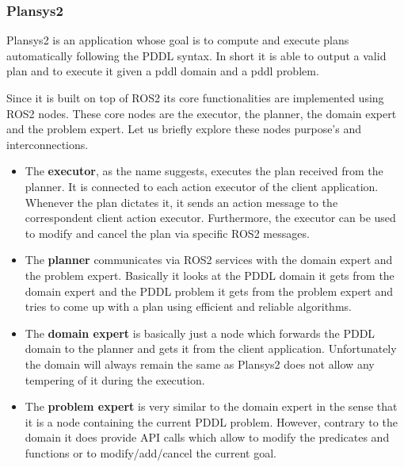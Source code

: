 \subsubsection{Plansys2} Plansys2 is an application whose goal is to compute and execute plans automatically following the PDDL syntax. In short it is able to output a valid plan and to execute it given a pddl domain and a pddl problem.
\par
Since it is built on top of ROS2 its core functionalities are implemented using ROS2 nodes. These core nodes are the executor, the planner, the domain expert and the problem expert. Let us briefly explore these nodes purpose's and interconnections.
\begin{itemize}
    \item The \textbf{executor}, as the name suggests, executes the plan received from the planner. It is connected to each action executor of the client application. Whenever the plan dictates it, it sends an action message to the correspondent client action executor. Furthermore, the executor can be used to modify and cancel the plan via specific ROS2 messages.
    \item The \textbf{planner} communicates via ROS2 services with the domain expert and the problem expert. Basically it looks at the PDDL domain it gets from the domain expert and the PDDL problem it gets from the problem expert and tries to come up with a plan using efficient and reliable algorithms.
    \item The \textbf{domain expert} is basically just a node which forwards the PDDL domain to the planner and gets it from the client application. Unfortunately the domain will always remain the same as Plansys2 does not allow any tempering of it during the execution.
    \item The \textbf{problem expert} is very similar to the domain expert in the sense that it is a node containing the current PDDL problem. However, contrary to the domain it does provide API calls which allow to modify the predicates and functions or to modify/add/cancel the current goal. 
\end{itemize}
\cite{plansys2_docs}
